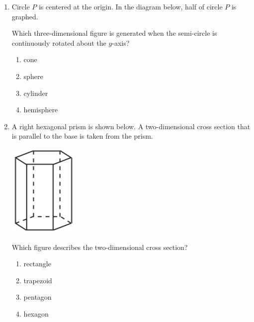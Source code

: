 \documentclass[12pt, twoside]{article}
\begin{document}
\begin{enumerate}
\item %
  Circle $P$ is centered at the origin. In the diagram below, half of circle $P$ is graphed.
    \begin{center}
      \end{center}
    Which three-dimensional figure is generated when the semi-circle is continuously rotated about the $y$-axis?
    \begin{multicols}{2}
      \begin{enumerate}
      \item cone
      \item sphere
      \item cylinder
      \item hemisphere
      \end{enumerate}
    \end{multicols}

  \item %
  A right hexagonal prism is shown below. A two-dimensional cross section that is parallel to the base is taken from the prism.
    \begin{center}
    \includegraphics[scale=0.4]{hex-prism_JA2018.png}
    \end{center}
   Which figure describes the two-dimensional cross section?
    \begin{multicols}{2}
      \begin{enumerate}
        \item rectangle
        \item trapezoid
        \item pentagon
        \item hexagon
      \end{enumerate}
    \end{multicols}


\end{enumerate}
\end{document}
